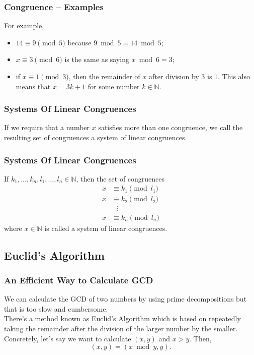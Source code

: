 \documentclass[aspectratio=169,11pt,usenames,dvipsnames,handout]{beamer}
\newcommand{\N}{\mathbb{N}}
\begin{document}
\begin{frame}
 \frametitle{Congruence -- Examples}
 For example,
 \begin{itemize}
  \item $14 \equiv 9 \pmod{5}$ because $9 \bmod 5 = 14 \bmod 5$;
  \pause
  \item $x \equiv 3 \pmod{6}$ is the same as saying $x \bmod 6 = 3$;
  \pause
  \item if $x \equiv 1 \pmod{3}$, then the remainder of $x$ after division by
   $3$ is $1$. This also means that $x = 3k + 1$ for some number $k \in \N$.
 \end{itemize}
\end{frame}

\begin{frame}
 \frametitle{Systems Of Linear Congruences}
 If we require that a number $x$ satisfies more than one congruence, we call the
 resulting set of congruences a \alert{system of linear congruences}.\\
\end{frame}

\begin{frame}
 \frametitle{Systems Of Linear Congruences}
 \begin{tcolorbox}[title=System Of Linear Congruences]
  If $k_1,\ldots,k_n,l_1,\ldots,l_n \in \N$, then the set of congruences
  \begin{equation*}
   \begin{split}
    x & \equiv k_1 \pmod{l_1}\\
    x & \equiv k_2 \pmod{l_2}\\
      &~~~\vdots\\
    x & \equiv k_n \pmod{l_n}
   \end{split}
  \end{equation*}
  where $x \in \N$ is called a \alert{system of linear congruences}.
 \end{tcolorbox}
\end{frame}

\subsection{Euclid's Algorithm}

\begin{frame}
 \subsectionpage
\end{frame}

\begin{frame}
 \frametitle{An Eff\hspace*{0pt}icient Way to Calculate GCD}
 We can calculate the GCD of two numbers by using prime decompositions but that
 is too slow and cumbersome.\\
 \pause
 There's a method known as \alert{Euclid's Algorithm} which is based on
 repeatedly taking the remainder after the division of the larger number by the
 smaller.\\
 \pause
 Concretely, let's say we want to calculate $(x,y)$ and $x > y$. Then,
 \[
  (x,y) = (x \bmod y, y).
 \]
\end{frame}
\end{document}
